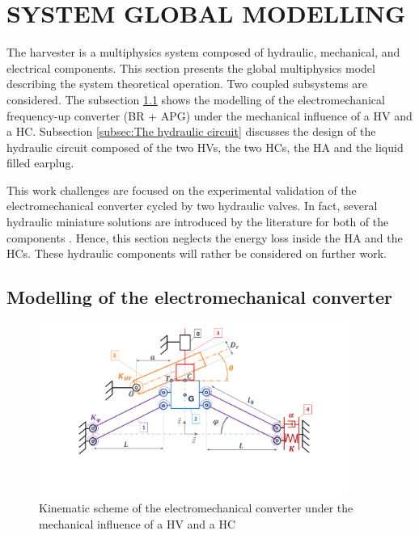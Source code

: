\documentclass[3p,twocolumn,preprint]{elsarticle}
\begin{document}
\section{SYSTEM GLOBAL MODELLING}
\label{sec:SYSTEM MODELING}
The harvester is a multiphysics system composed of hydraulic, mechanical, and electrical components. This section presents the global multiphysics model describing the system theoretical operation. Two coupled subsystems are considered. The subsection \ref{subsec:The electromechanical converter} shows the modelling of the electromechanical frequency-up converter (BR + APG) under the mechanical influence of a HV and a HC. Subsection \ref{subsec:The hydraulic circuit} discusses the design of the hydraulic circuit composed of the two HVs, the two HCs, the HA and the liquid filled earplug.

This work challenges are focused on the experimental validation of the electromechanical converter cycled by two hydraulic valves. In fact, several hydraulic miniature solutions are introduced by the literature for both of the components \cite{Wang2020,Xu2021,Zhu2013}. Hence, this section neglects the energy loss inside the HA and the HCs. These hydraulic components will rather be considered on further work. 
	\subsection{Modelling of the electromechanical converter}	
	\label{subsec:The electromechanical converter}
\begin{figure}[!htbp]
	\centering
	\captionsetup{justification=centering}
	\includegraphics[trim={0cm 0cm 0cm 0cm},clip, width=0.9\textwidth]{figures/schema_cinematique1.pdf}
	\caption{Kinematic scheme of the electromechanical converter under the mechanical influence of a HV and a HC}
	\label{fig:schema_cinematique1}
\end{figure}
\end{document}
